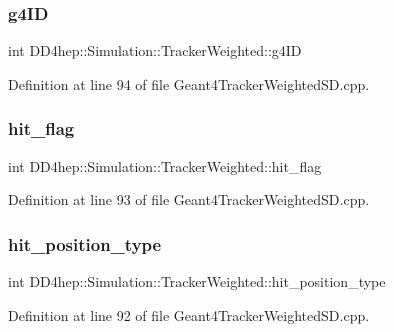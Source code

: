 \subsubsection{\texorpdfstring{g4\+ID}{g4ID}}
{\footnotesize\ttfamily int D\+D4hep\+::\+Simulation\+::\+Tracker\+Weighted\+::g4\+ID}



Definition at line 94 of file Geant4\+Tracker\+Weighted\+S\+D.\+cpp.

\hypertarget{struct_d_d4hep_1_1_simulation_1_1_tracker_weighted_a9ffa7f998b3a1f16864ecbb894ca2e54}{}\label{struct_d_d4hep_1_1_simulation_1_1_tracker_weighted_a9ffa7f998b3a1f16864ecbb894ca2e54} 
\subsubsection{\texorpdfstring{hit\+\_\+flag}{hit\_flag}}
{\footnotesize\ttfamily int D\+D4hep\+::\+Simulation\+::\+Tracker\+Weighted\+::hit\+\_\+flag}



Definition at line 93 of file Geant4\+Tracker\+Weighted\+S\+D.\+cpp.

\hypertarget{struct_d_d4hep_1_1_simulation_1_1_tracker_weighted_a5120f0b661148efb35b7432c8c58c7ce}{}\label{struct_d_d4hep_1_1_simulation_1_1_tracker_weighted_a5120f0b661148efb35b7432c8c58c7ce} 
\subsubsection{\texorpdfstring{hit\+\_\+position\+\_\+type}{hit\_position\_type}}
{\footnotesize\ttfamily int D\+D4hep\+::\+Simulation\+::\+Tracker\+Weighted\+::hit\+\_\+position\+\_\+type}



Definition at line 92 of file Geant4\+Tracker\+Weighted\+S\+D.\+cpp.

\hypertarget{struct_d_d4hep_1_1_simulation_1_1_tracker_weighted_afc2a6289bb11f08b03d50e0b8e271083}{}\label{struct_d_d4hep_1_1_simulation_1_1_tracker_weighted_afc2a6289bb11f08b03d50e0b8e271083} 
